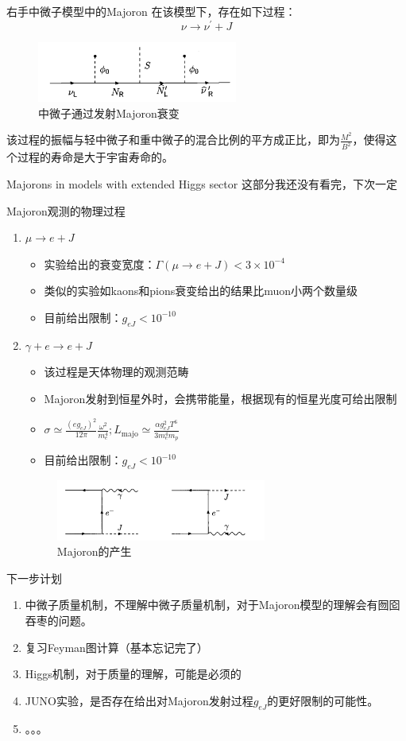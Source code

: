 \documentclass[11pt]{beamer}
\begin{document}
\begin{frame}{右手中微子模型中的Majoron}
在该模型下，存在如下过程：
$$
\nu \rightarrow \nu^{\prime}+J
$$
\begin{figure}[H]
 \centering
 \includegraphics[height=2cm]{pic/2.png}
 \caption{中微子通过发射Majoron衰变}
 \label{fig:2}
\end{figure}
该过程的振幅与轻中微子和重中微子的混合比例的平方成正比，即为$\frac{M^2}{B^2}$，使得这个过程的寿命是大于宇宙寿命的。
\end{frame}

\begin{frame}{Majorons in models with extended Higgs sector}
这部分我还没有看完，下次一定
\end{frame}

\begin{frame}{Majoron观测的物理过程}
\begin{enumerate}
\item {$\mu \rightarrow e+J$
\begin{itemize}
\item {实验给出的衰变宽度：$\Gamma(\mu \rightarrow e+J)<3\times 10^{-4}$}
\item {类似的实验如kaons和pions衰变给出的结果比muon小两个数量级}
\item {目前给出限制：$g_{eJ}<10^{-10}$}
\end{itemize}}
\item {$\gamma+e \rightarrow e + J$
\begin{itemize}
\item {该过程是天体物理的观测范畴}
\item {Majoron发射到恒星外时，会携带能量，根据现有的恒星光度可给出限制}
\item {$
\sigma \simeq \frac{\left(e g_{e J}\right)^{2}}{12 \pi} \frac{\omega^{2}}{m_{e}^{4}};
L_{\mathrm{majo}} \simeq \frac{\alpha g_{e J}^{2} T^{6}}{3 m_{e}^{4} m_{p}}
$}
\item {目前给出限制：$g_{eJ}<10^{-10}$}
\end{itemize}
\begin{figure}[H]
 \centering
 \includegraphics[height=2cm]{pic/3.png}
 \caption{Majoron的产生}
 \label{fig:2}
\end{figure}
}
\end{enumerate}
\end{frame}

\begin{frame}{下一步计划}
\begin{enumerate}
\item {中微子质量机制，不理解中微子质量机制，对于Majoron模型的理解会有囫囵吞枣的问题。}
\item {复习Feyman图计算（基本忘记完了）}
\item {Higgs机制，对于质量的理解，可能是必须的}
\item {JUNO实验，是否存在给出对Majoron发射过程$g_{eJ}$的更好限制的可能性。}
\item {。。。}
\end{enumerate}
\end{frame}
\end{document}
